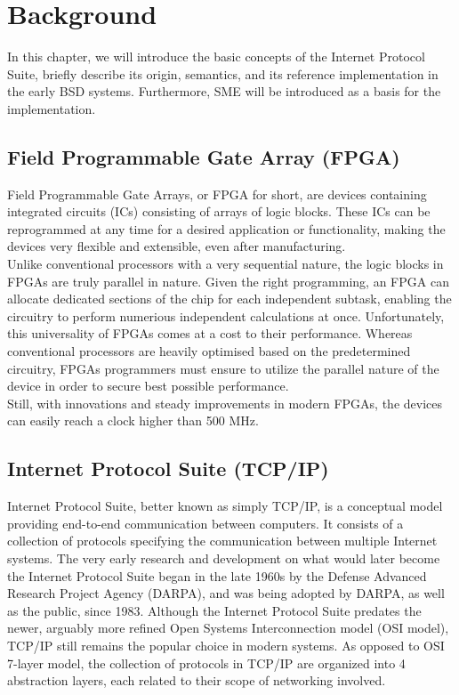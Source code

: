 \chapter{Background}


In this chapter, we will introduce the basic concepts of the Internet Protocol
Suite, briefly describe its origin, semantics, and its reference implementation
in the early BSD systems.
Furthermore, SME will be introduced as a basis for the implementation.


\section{Field Programmable Gate Array (FPGA)}
Field Programmable Gate Arrays, or FPGA for short, are devices containing 
integrated circuits (ICs) consisting of arrays of logic blocks. These ICs can 
be reprogrammed at any time for a desired application or functionality\cite{ni_fpga},
making the devices very flexible and extensible, even after manufacturing.\\
Unlike conventional processors with a very sequential nature, the logic blocks 
in FPGAs are truly parallel in nature. Given the right programming, an FPGA can
allocate dedicated sections of the chip for each independent subtask, enabling
the circuitry to perform numerious independent calculations at once\cite{ni_fpga}.
Unfortunately, this universality of FPGAs comes at a cost to their performance.
Whereas conventional processors are heavily optimised based on the predetermined 
circuitry, FPGAs programmers must ensure to utilize the parallel nature of the
device in order to secure best possible performance.\\
Still, with innovations and steady improvements in modern FPGAs, the devices 
can easily reach a clock higher than 500 MHz\cite{xilinx_fpga}.   





\section{Internet Protocol Suite (TCP/IP)}
Internet Protocol Suite, better known as simply TCP/IP, is a conceptual
model providing end-to-end communication between computers. It consists of
a collection of protocols specifying the communication between multiple
Internet systems\cite{RFC1122}.  The very early research and development
on what would later become the Internet Protocol Suite began in the late 1960s
by the Defense Advanced Research Project Agency (DARPA), and was being
adopted by DARPA, as well as the public, since 1983\cite{DARPA_internet}.
Although the Internet Protocol Suite predates the newer, arguably more
refined Open Systems Interconnection model (OSI model), TCP/IP still
remains the popular choice in modern systems.  As opposed to OSI 7-layer
model\cite{X.200}, the collection of protocols in TCP/IP are organized
into 4 abstraction layers, each related to their scope of networking
involved.

